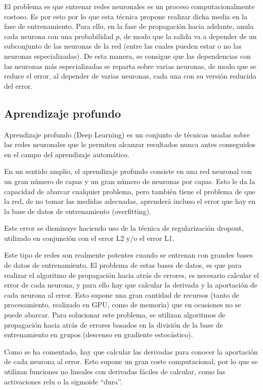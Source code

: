 El problema es que entrenar redes neuronales es un proceso computacionalmente costoso. Es por esto por lo que esta técnica propone realizar dicha media en la fase de entrenamiento. Para ello, en la fase de propagación hacia adelante, anula cada neurona con una probabilidad $p$, de modo que la salida va a depender de un subconjunto de las neuronas de la red (entre las cuales pueden estar o no las neuronas especializadas). De esta manera, se consigue que las dependencias con las neuronas más especializadas se reparta sobre varias neuronas, de modo que se reduce el error, al depender de varias neuronas, cada una con su versión reducida del error.
\subsection{Aprendizaje profundo}
Aprendizaje profundo (Deep Learning) \cite{schmidhuber2015deep}\cite{udacitydeeplearning} es un conjunto de técnicas usadas sobre las redes neuronales que le permiten alcanzar resultados nunca antes conseguidos en el campo del aprendizaje automático.

En un sentido amplio, el aprendizaje profundo consiste en una red neuronal con un gran número de capas y un gran número de neuronas por capas. Esto le da la capacidad de abarcar cualquier problema, pero también tiene el problema de que la red, de no tomar las medidas adecuadas, aprenderá incluso el error que hay en la base de datos de entrenamiento (overfitting).

Este error se disminuye haciendo uso de la técnica de regularización dropout, utilizado en conjunción con el error L2 y/o el error L1.

Este tipo de redes son realmente potentes cuando se entrenan con grandes bases de datos de entrenamiento. El problema de estas bases de datos, es que para realizar el algoritmo de propagación hacia atrás de errores, es necesario calcular el error de cada neurona, y para ello hay que calcular la derivada y la aportación de cada neurona al error. Esto supone una gran cantidad de recursos (tanto de procesamiento, realizado en GPU, como de memoria) que en ocasiones no se puede abarcar. Para solucionar este problema, se utilizan algoritmos de propagación hacia atrás de errores basados en la división de la base de entrenamiento en grupos (descenso en gradiente estocástico).

Como se ha comentado, hay que calcular las derivadas para conocer la aportación de cada neurona al error. Esto supone un gran coste computacional, por lo que se utilizan funciones no lineales con derivadas fáciles de calcular, como las activaciones relu o la sigmoide ``dura''.

